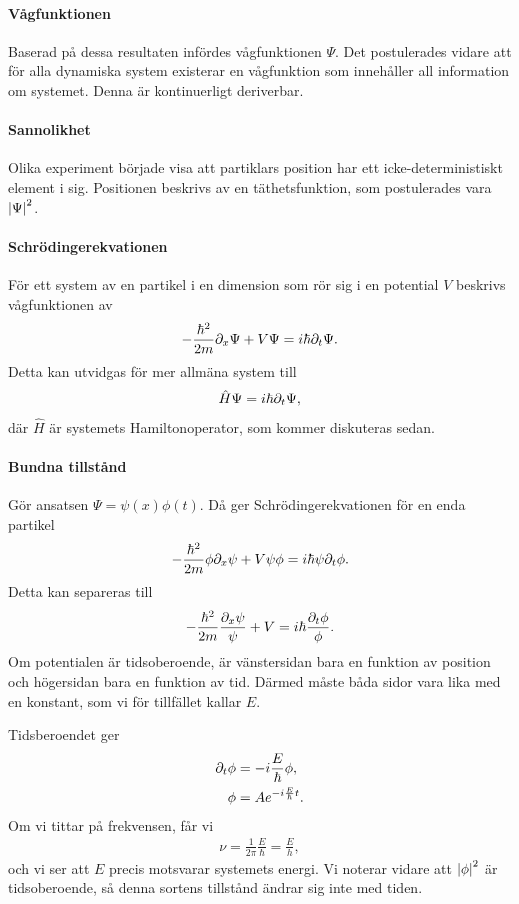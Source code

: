 \paragraph{Vågfunktionen}
Baserad på dessa resultaten infördes vågfunktionen $\Psi$. Det postulerades vidare att för alla dynamiska system existerar en vågfunktion som innehåller all information om systemet.
Denna är kontinuerligt deriverbar.

\paragraph{Sannolikhet}
Olika experiment började visa att partiklars position har ett icke-deterministiskt element i sig. Positionen beskrivs av en täthetsfunktion, som postulerades vara $\abs{\Psi}^{2}$.

\paragraph{Schrödingerekvationen}
För ett system av en partikel i en dimension som rör sig i en potential $V$ beskrivs vågfunktionen av
\begin{align*}
	-\frac{\hbar^{2}}{2m}\partial_{x}\Psi + V\Psi = i\hbar\partial_{t}\Psi.
\end{align*}
Detta kan utvidgas för mer allmäna system till
\begin{align*}
	\hat{H}\Psi = i\hbar\partial_{t}\Psi,
\end{align*}
där $\hat{H}$ är systemets Hamiltonoperator, som kommer diskuteras sedan.

\paragraph{Bundna tillstånd}
Gör ansatsen $\Psi = \psi(x)\phi(t)$. Då ger Schrödingerekvationen för en enda partikel
\begin{align*}
	-\frac{\hbar^{2}}{2m}\phi\partial_{x}\psi + V\psi\phi = i\hbar\psi\partial_{t}\phi.
\end{align*}
Detta kan separeras till
\begin{align*}
	-\frac{\hbar^{2}}{2m}\frac{\partial_{x}\psi}{\psi} + V = i\hbar\frac{\partial_{t}\phi}{\phi}.
\end{align*}
Om potentialen är tidsoberoende, är vänstersidan bara en funktion av position och högersidan bara en funktion av tid. Därmed måste båda sidor vara lika med en konstant, som vi för tillfället kallar $E$.

Tidsberoendet ger
\begin{align*}
	\partial_{t}\phi &= -i\frac{E}{\hbar}\phi, \\
	\phi          &= Ae^{-i\frac{E}{\hbar}t}.
\end{align*}
Om vi tittar på frekvensen, får vi
\begin{align*}
	\nu = \frac{1}{2\pi}\frac{E}{\hbar} = \frac{E}{h},
\end{align*}
och vi ser att $E$ precis motsvarar systemets energi. Vi noterar vidare att $\abs{\phi}^{2}$ är tidsoberoende, så denna sortens tillstånd ändrar sig inte med tiden.

